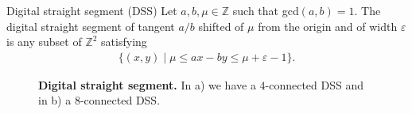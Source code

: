 \begin{definition}{Digital straight segment (DSS)}
Let $a,b,\mu \in \mathbb{Z}$ such that gcd$(a,b)=1$. The digital straight segment of tangent $a/b$ shifted of $\mu$ from the origin and of width $\varepsilon$ is any subset of $\mathbb{Z}^2$ satisfying~
\begin{align*}
	\{ (x,y) \; | \; \mu \leq ax - by \leq \mu + \varepsilon - 1 \}.
\end{align*}
\end{definition}
\begin{figure}
\center
{}
\caption{\textbf{Digital straight segment.} In a) we have a $4$-connected DSS and in b) a $8$-connected DSS.}
\label{ch5:fig:dss}
\end{figure}

